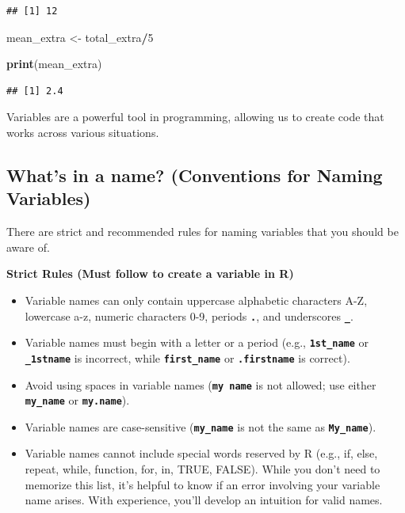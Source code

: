 \documentclass[
]{book}
\newenvironment{Shaded}{\begin{snugshade}}{\end{snugshade}}
\newcommand{\DecValTok}[1]{\textcolor[rgb]{0.00,0.00,0.81}{#1}}
\newcommand{\FunctionTok}[1]{\textcolor[rgb]{0.13,0.29,0.53}{\textbf{#1}}}
\newcommand{\NormalTok}[1]{#1}
\newcommand{\OtherTok}[1]{\textcolor[rgb]{0.56,0.35,0.01}{#1}}
\newcommand{\SpecialCharTok}[1]{\textcolor[rgb]{0.81,0.36,0.00}{\textbf{#1}}}
\begin{document}
\begin{verbatim}
## [1] 12
\end{verbatim}

\begin{Shaded}
\begin{Highlighting}[]
\NormalTok{mean\_extra }\OtherTok{\textless{}{-}}\NormalTok{  total\_extra}\SpecialCharTok{/}\DecValTok{5}

\FunctionTok{print}\NormalTok{(mean\_extra)}
\end{Highlighting}
\end{Shaded}

\begin{verbatim}
## [1] 2.4
\end{verbatim}

Variables are a powerful tool in programming, allowing us to create code that works across various situations.

\hypertarget{whats-in-a-name-conventions-for-naming-variables}{%
\subsection{What's in a name? (Conventions for Naming Variables)}\label{whats-in-a-name-conventions-for-naming-variables}}

There are strict and recommended rules for naming variables that you should be aware of.

\textbf{Strict Rules (Must follow to create a variable in R)}

\begin{itemize}
\item
  Variable names can only contain uppercase alphabetic characters A-Z, lowercase a-z, numeric characters 0-9, periods \textbf{\texttt{.}}, and underscores \textbf{\texttt{\_}}.
\item
  Variable names must begin with a letter or a period (e.g., \textbf{\texttt{1st\_name}} or \textbf{\texttt{\_1stname}} is incorrect, while \textbf{\texttt{first\_name}} or \textbf{\texttt{.firstname}} is correct).
\item
  Avoid using spaces in variable names (\textbf{\texttt{my\ name}} is not allowed; use either \textbf{\texttt{my\_name}} or \textbf{\texttt{my.name}}).
\item
  Variable names are case-sensitive (\textbf{\texttt{my\_name}} is not the same as \textbf{\texttt{My\_name}}).
\item
  Variable names cannot include special words reserved by R (e.g., if, else, repeat, while, function, for, in, TRUE, FALSE). While you don't need to memorize this list, it's helpful to know if an error involving your variable name arises. With experience, you'll develop an intuition for valid names.
\end{itemize}
\end{document}
